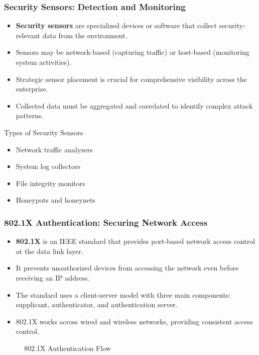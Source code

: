 \documentclass{beamer}
\begin{document}
\begin{frame}
    \frametitle{Security Sensors: Detection and Monitoring}
    \begin{itemize}
        \item \textbf{Security sensors} are specialized devices or software that collect security-relevant data from the environment.
        \item Sensors may be network-based (capturing traffic) or host-based (monitoring system activities).
        \item Strategic sensor placement is crucial for comprehensive visibility across the enterprise.
        \item Collected data must be aggregated and correlated to identify complex attack patterns.
    \end{itemize}
    
    \begin{exampleblock}{Types of Security Sensors}
        \begin{itemize}
            \item Network traffic analyzers
            \item System log collectors
            \item File integrity monitors
            \item Honeypots and honeynets
        \end{itemize}
    \end{exampleblock}
\end{frame}

\begin{frame}
    \frametitle{802.1X Authentication: Securing Network Access}
    \begin{itemize}
        \item \textbf{802.1X} is an IEEE standard that provides port-based network access control at the data link layer.
        \item It prevents unauthorized devices from accessing the network even before receiving an IP address.
        \item The standard uses a client-server model with three main components: supplicant, authenticator, and authentication server.
        \item 802.1X works across wired and wireless networks, providing consistent access control.
    \end{itemize}
    
    \begin{figure}
        \centering
        \caption{802.1X Authentication Flow}
    \end{figure}
\end{frame}
\end{document}
